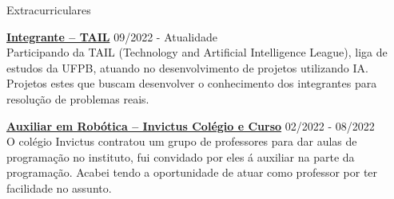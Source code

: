 \documentclass{resume} %
\begin{document}
\begin{rSection}{Extracurriculares} \itemsep -1pt {}

    \item \textbf{\href{https://www.instagram.com/tailufpb/}{Integrante – TAIL}} \hfill 09/2022 - Atualidade \\
    Participando da TAIL (Technology and Artificial Intelligence League), liga de estudos da UFPB, atuando no desenvolvimento de projetos utilizando IA. Projetos estes que buscam desenvolver o conhecimento dos integrantes para resolução de problemas reais.
    
    \item \textbf{\href{https://www.escolainvictus.com/}{Auxiliar em Robótica – Invictus Colégio e Curso}} \hfill 02/2022 - 08/2022 \\
    O colégio Invictus contratou um grupo de professores para dar aulas de programação no instituto, fui convidado por eles á auxiliar na parte da programação. Acabei tendo a oportunidade de atuar como professor por ter facilidade no assunto.
    
\end{rSection}

\end{document}
